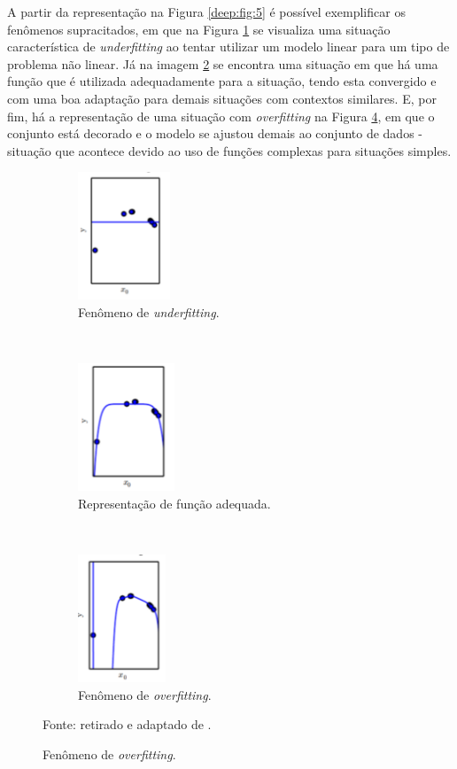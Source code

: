 A partir da representação na Figura \ref{deep:fig:5} é possível exemplificar os fenômenos supracitados, em que na Figura \ref{deep:fig:5.1} se visualiza uma situação característica de \textit{underfitting} ao tentar utilizar um modelo linear para um tipo de problema não linear. Já na imagem \ref{deep:fig:5.2} se encontra uma situação em que há uma função que é utilizada adequadamente para a situação, tendo esta convergido e com uma boa adaptação para demais situações com contextos similares. E, por fim, há a representação de uma situação com \textit{overfitting} na Figura \ref{deep:fig:5.3}, em que o conjunto está decorado e o modelo se ajustou demais ao conjunto de dados - situação que acontece devido ao uso de funções complexas para situações simples.

\begin{figure}[H]
   \caption{Fenômenos de \textit{underfitting} e \textit{overfitting}.}
   \centering
   \label{deep:fig:5}
    \begin{subfigure}[t]{0.45\textwidth}
        \centering
        \includegraphics[height=1.5in]{recursos/imagens/deep/under.png}
        \caption{Fenômeno de \textit{underfitting}.}
        \label{deep:fig:5.1}
    \end{subfigure}
    ~ 
    \begin{subfigure}[t]{0.45\textwidth}
        \centering
        \includegraphics[height=1.5in]{recursos/imagens/deep/apx.png}
        \caption{Representação de função adequada.}
        \label{deep:fig:5.2}
    \end{subfigure}
    ~
    \begin{subfigure}[t]{0.45\textwidth}
        \centering
        \includegraphics[height=1.5in]{recursos/imagens/deep/over.png}
        \caption{Fenômeno de \textit{overfitting}.}
        \label{deep:fig:5.3}
    \end{subfigure}

    Fonte: retirado e adaptado de \cite{Goodfellow2016}.
\end{figure}

